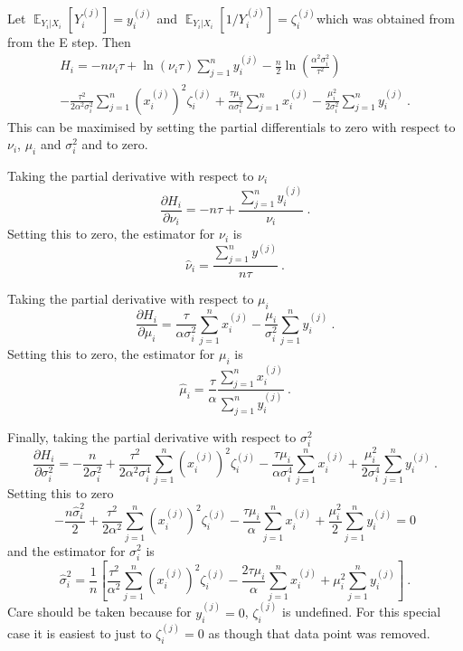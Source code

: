 \documentclass[12pt]{report}
\DeclareMathOperator{\expectation}{\mathbb{E}}
\begin{document}
Let $\expectation_{Y_i|X_i}\left[Y_i^{(j)}\right]=y_i^{(j)}$ and $\expectation_{Y_i|X_i}\left[1/Y_i^{(j)}\right]=\zeta_i^{(j)}$which was obtained from from the E step. Then
\begin{multline}
H_i= -n\nu_i\tau+\ln(\nu_i\tau)\sum_{j=1}^ny_i^{(j)}-\frac{n}{2}\ln\left(\frac{\alpha^2\sigma_i^2}{\tau^2}\right)
\\
-\frac{\tau^2}{2\alpha^2\sigma_i^2}\sum_{j=1}^n\left(x_i^{(j)}\right)^2\zeta_i^{(j)}
+ \frac{\tau\mu_i}{\alpha\sigma_i^2}\sum_{j=1}^nx_i^{(j)}
-\frac{\mu_i^2}{2\sigma_i^2}\sum_{j=1}^ny_i^{(j)}
\ .
\end{multline}
This can be maximised by setting the partial differentials to zero with respect to $\nu_i$, $\mu_i$ and $\sigma_i^2$ and  to zero.

Taking the partial derivative with respect to $\nu_i$
\begin{equation}
\frac{\partial H_i}{\partial \nu_i}=-n\tau+\frac{\sum_{j=1}^ny_i^{(j)}}{\nu_i} \ .
\end{equation}
Setting this to zero, the estimator for $\nu_i$ is
\begin{equation}
\widehat{\nu}_i=\frac{\sum_{j=1}^ny^{(j)}}{n\tau} \ .
\end{equation}

Taking the partial derivative with respect to $\mu_i$
\begin{equation}
\frac{\partial H_i}{\partial \mu_i} = \frac{\tau}{\alpha\sigma_i^2}\sum_{j=1}^nx_i^{(j)}-\frac{\mu_i}{\sigma_i^2}\sum_{j=1}^n y_i^{(j)} \ .
\end{equation}
Setting this to zero, the estimator for $\mu_i$ is
\begin{equation}
\widehat{\mu}_i=\frac{\tau}{\alpha} \frac{\sum_{j=1}^n x_i^{(j)}}{\sum_{j=1}^n y_i^{(j)}} \ .
\end{equation}

Finally, taking the partial derivative with respect to $\sigma_i^2$
\begin{equation}
\frac{\partial H_i}{\partial \sigma_i^2} = -\frac{n}{2\sigma_i^2}+\frac{\tau^2}{2\alpha^2\sigma_i^4}\sum_{j=1}^n\left(x_i^{(j)}\right)^2\zeta_i^{(j)} - \frac{\tau\mu_i}{\alpha\sigma_i^4}\sum_{j=1}^nx_i^{(j)} + \frac{\mu_i^2}{2\sigma_i^4}\sum_{j=1}^ny_i^{(j)} \ .
\end{equation}
Setting this to zero
\begin{equation*}
-\frac{n\widehat{\sigma}_i^2}{2}+\frac{\tau^2}{2\alpha^2}\sum_{j=1}^n\left(x_i^{(j)}\right)^2\zeta_i^{(j)} - \frac{\tau\mu_i}{\alpha}\sum_{j=1}^nx_i^{(j)} + \frac{\mu_i^2}{2}\sum_{j=1}^ny_i^{(j)} = 0
\end{equation*}
and the estimator for $\sigma_i^2$ is
\begin{equation}
\widehat{\sigma}_i^2=\frac{1}{n}\left[
\frac{\tau^2}{\alpha^2}\sum_{j=1}^n\left(x_i^{(j)}\right)^2\zeta_i^{(j)}
-\frac{2\tau\mu_i}{\alpha}\sum_{j=1}^nx_i^{(j)}
+\mu_i^2\sum_{j=1}^ny_i^{(j)}
\right] \ .
\end{equation}
Care should be taken because for $y_i^{(j)}=0$, $\zeta_i^{(j)}$ is undefined. For this special case it is easiest to just to $\zeta_i^{(j)}=0$ as though that data point was removed.




\end{document}
